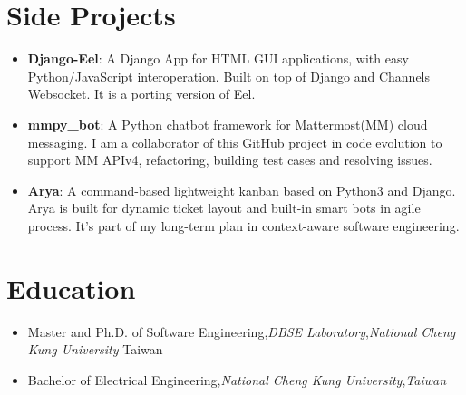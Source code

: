 \documentclass[a4paper,11pt]{article}
\newcommand{\resumeItem}[2]{
  \item{
    \textbf{\small#1}{: \small#2 \vspace{-2pt}}
  }
}
\newcommand{\resumeEducationItem}[3]{
  \vspace{-1pt}\item
    {#1}{,}\hspace{4pt}\textit{#2}{,}\hspace{4pt}\textit{#3}\vspace{-6pt}
}
\newcommand{\resumeSubItem}[2]{\resumeItem{#1}{#2}\vspace{-4pt}}
\newcommand{\resumeSubHeadingListStart}{\begin{itemize}[leftmargin=*]}
\newcommand{\resumeSubHeadingListEnd}{\end{itemize}}
\newcommand\smalldiv{\smash{\raisebox{0.29ex}{\scalebox{0.8}{/}}}}
\begin{document}
\section{Side Projects}
  \resumeSubHeadingListStart
    \resumeSubItem{Django-Eel}
      {A Django App for HTML GUI applications, with easy Python/JavaScript interoperation. Built on top of Django and Channels Websocket. It is a porting version of Eel.}
    \resumeSubItem{mmpy\_bot}
      {A Python chatbot framework for Mattermost(MM) cloud messaging. I am a collaborator of this GitHub project in code evolution to support MM APIv4, refactoring, building test cases and resolving issues.}
    \resumeSubItem{Arya}
      {A command-based lightweight kanban based on Python3 and Django. Arya is built for dynamic ticket layout and built-in smart bots in agile process. It's part of my long-term plan in context-aware software engineering.}
  \resumeSubHeadingListEnd


\section{Education}
  \resumeSubHeadingListStart
    \resumeEducationItem
      {Master and Ph.D. of Software Engineering}{DBSE Laboratory}{National Cheng Kung University}{Taiwan}
    \resumeEducationItem
      {Bachelor of Electrical Engineering}{National Cheng Kung University}{Taiwan}
  \resumeSubHeadingListEnd

%


\end{document}
